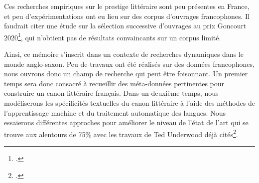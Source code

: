 Ces recherches empiriques sur le prestige littéraire sont peu présentes en France, et peu d'expérimentations ont eu lieu sur des corpus d'ouvrages francophones. Il faudrait citer une étude sur la sélection successive d'ouvrages au prix Goncourt 2020\footcites{bernard_goncourt_2021}, qui n'obtient pas de résultats convaincants sur un corpus limité. 

Ainsi, ce mémoire s'inscrit dans un contexte de recherches dynamiques dans le monde anglo-saxon. Peu de travaux ont été réalisés sur des données francophones, nous ouvrons donc un champ de recherche qui peut être foisonnant. Un premier temps sera donc consacré à recueillir des méta-données pertinentes pour construire un canon littéraire français. Dans un deuxième temps, nous modéliserons les spécificités textuelles du canon littéraire à l'aide des méthodes de l'apprentissage machine et du traitement automatique des langues. Nous essaierons différentes approches pour améliorer le niveau de l'état de l'art qui se trouve aux alentours de 75\% avec les travaux de Ted Underwood déjà cités\footcites{underwood_longue_2016}.
